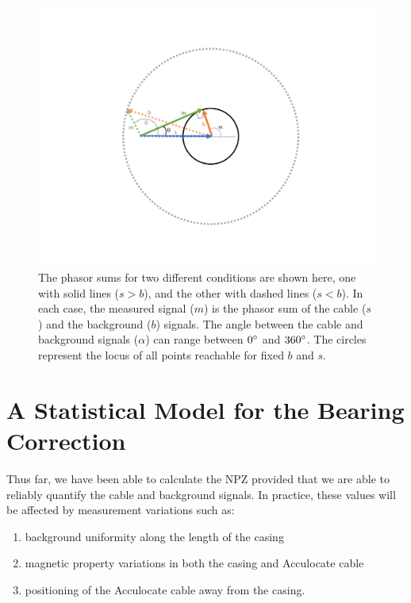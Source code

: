 \documentclass[paper=a4, fontsize=11pt]{scrartcl}
\numberwithin{equation}{section}		%
\numberwithin{figure}{section}			%
\numberwithin{table}{section}				%
\begin{document}
\begin{appendices}
\begin{figure}[H]
  \caption{The phasor sums for two different conditions are shown here, one with solid lines ($s>b$), and the other with dashed lines ($s<b$).  In each case, the measured signal ($m$) is the phasor sum of the cable ($s$) and the background ($b$) signals. The angle between the cable and background signals ($\alpha$) can range between $0\degree$ and $360\degree$.  The circles represent the locus of all points reachable for fixed $b$ and $s$.
  }
  \label{fig:angle_limits}
  \centering
  \includegraphics[width=1.0\textwidth]{figures/angle_limits.pdf}
\end{figure}

\newpage
\section{A Statistical Model for the Bearing Correction}\label{section:statistical_model}
Thus far, we have been able to calculate the NPZ provided that we are able to reliably quantify the cable and background signals.  In practice, these values will be affected by measurement variations such as:
\begin{enumerate}
    \item background uniformity along the length of the casing
    \item magnetic property variations in both the casing and Acculocate cable
    \item positioning of the Acculocate cable away from the casing.
\end{enumerate}


\end{appendices}
\end{document}
